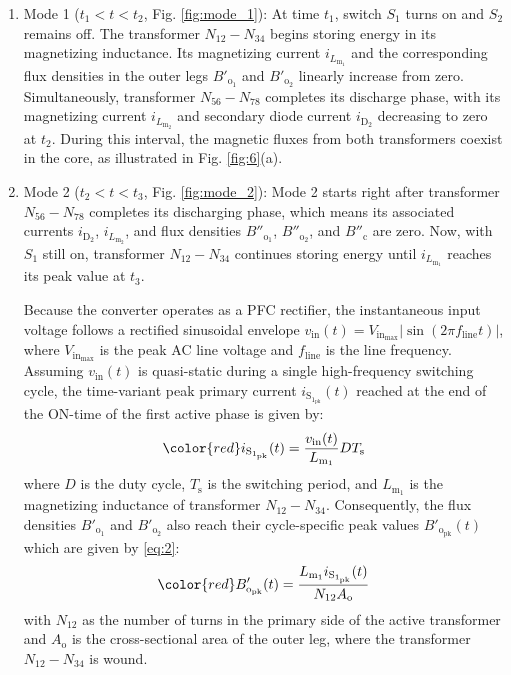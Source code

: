 \documentclass[lettersize,journal]{IEEEtran}
\begin{document}
\begin{enumerate}
    \item Mode 1 ($t_1 < t < t_2$, Fig. \ref{fig:mode_1}): At time $t_1$, switch $S_1$ turns on and $S_2$ remains off. The transformer $N_{12}-N_{34}$ begins storing energy in its magnetizing inductance. Its magnetizing current $i_{L_{\mathrm{m}_1}}$ and the corresponding flux densities in the outer legs $B'_{\mathrm{o}_1}$ and $B'_{\mathrm{o}_2}$ linearly increase from zero. Simultaneously, transformer $N_{56}-N_{78}$ completes its discharge phase, with its magnetizing current $i_{L_{\mathrm{m}_2}}$ and secondary diode current $i_{\mathrm{D}_2}$ decreasing to zero at $t_2$. {\color{red} During this interval, the magnetic fluxes from both transformers coexist in the core, as illustrated in Fig. \ref{fig:6}(a).}

    \item Mode 2 ($t_2 < t < t_3$, Fig. \ref{fig:mode_2}): Mode 2 starts right after transformer $N_{56}-N_{78}$ completes its discharging phase, which means its associated currents $i_{\mathrm{D}_2}$, $i_{L_{\mathrm{m}_2}}$, and flux densities $B''_{\mathrm{o}_1}$, $B''_{\mathrm{o}_2}$, and $B''_{\mathrm{c}}$ are zero. Now, with $S_1$ still on, transformer $N_{12}-N_{34}$ continues storing energy until $i_{L_{\mathrm{m}_1}}$ reaches its peak value at $t_3$. 
    
    \vspace{\baselineskip}
    {\color{red} Because the converter operates as a PFC rectifier, the instantaneous input voltage follows a rectified sinusoidal envelope $v_{\mathrm{in}}(t) = V_{\mathrm{in}_{\mathrm{max}}} |\sin(2\pi f_{\mathrm{line}} t)|$, where $V_{\mathrm{in}_{\mathrm{max}}}$ is the peak AC line voltage and $f_{\mathrm{line}}$ is the line frequency. Assuming $v_{\mathrm{in}}(t)$ is quasi-static during a single high-frequency switching cycle, the time-variant peak primary current $i_{\mathrm{S}_{1_{\mathrm{pk}}}}(t)$ reached at the end of the ON-time of the first active phase is given by:}
    \begin{equation}
    \label{eq:1}
    {\color{red} i_{\mathrm{S}_{1_{\mathrm{pk}}}}(t) = \frac{v_{\mathrm{in}}(t)}{L_{\mathrm{m}_1}} D T_{\mathrm{s}} }
    \end{equation}
    where $D$ is the duty cycle, $T_{\mathrm{s}}$ is the switching period, and $L_{\mathrm{m}_1}$ is the magnetizing inductance of transformer $N_{12}-N_{34}$. {\color{red} Consequently, the flux densities $B'_{\mathrm{o}_1}$ and $B'_{\mathrm{o}_2}$ also reach their cycle-specific peak values $B'_{\mathrm{o}_{\mathrm{pk}}}(t)$ which are given by \eqref{eq:2}:}
    \begin{equation}
    \label{eq:2}
    {\color{red} B'_{\mathrm{o}_{\mathrm{pk}}}(t) = \frac{L_{\mathrm{m}_1} i_{\mathrm{S}_{1_{\mathrm{pk}}}}(t)}{N_{12} A_{\mathrm{o}}} }
    \end{equation}
    with $N_{12}$ as the number of turns in the primary side of the active transformer and $A_{\mathrm{o}}$ is the cross-sectional area of the outer leg, where the transformer $N_{12}-N_{34}$ is wound.


\end{enumerate}
\end{document}
